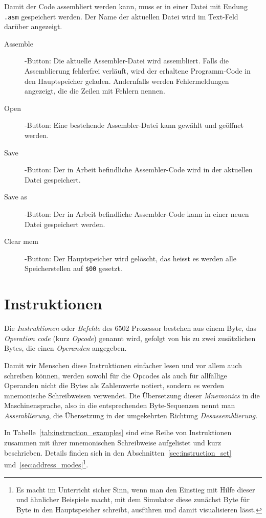 \documentclass[11pt]{scrartcl}
\newcommand{\hex}[1]{\texttt{\$#1}}
\begin{document}
\begin{itemize}
  Damit der Code assembliert werden kann, muss er in einer Datei mit
  Endung \lstinline!.asm! gespeichert werden. Der Name der aktuellen
  Datei wird im Text-Feld darüber angezeigt.
  \begin{description}
  \item[Assemble]-Button: Die aktuelle Assembler-Datei wird
    assembliert.
    Falls die Assemblierung fehlerfrei verläuft, wird der erhaltene
    Programm-Code in den Hauptspeicher geladen.
    Andernfalls werden Fehlermeldungen angezeigt, die die Zeilen mit
    Fehlern nennen.
  \item[Open]-Button: Eine bestehende Assembler-Datei kann gewählt und
    geöffnet werden.
  \item[Save]-Button: Der in Arbeit befindliche Assembler-Code wird in
    der aktuellen Datei gespeichert.
  \item[Save as]-Button: Der in Arbeit befindliche Assembler-Code kann
    in einer neuen Datei gespeichert werden.
  \item[Clear mem]-Button: Der Hauptspeicher wird gelöscht, das heisst
    es werden alle Speicherstellen auf \hex{00} gesetzt.
  \end{description}
\end{itemize}

\newpage

\section{Instruktionen}
\label{sec:instruktionen}


Die \emph{Instruktionen} oder \emph{Befehle} des 6502 Prozessor
bestehen aus einem Byte, das \emph{Operation code} (kurz
\emph{Opcode}) genannt wird, gefolgt von bis zu zwei zusätzlichen
Bytes, die einen \emph{Operanden} angegeben.

Damit wir Menschen diese Instruktionen einfacher lesen und vor allem auch
schreiben können, werden sowohl für die Opcodes als auch für
allfällige Operanden nicht die Bytes als Zahlenwerte notiert, sondern
es werden mnemonische Schreibweisen verwendet.
Die Übersetzung dieser \emph{Mnemonics} in die Maschinensprache, also
in die entsprechenden Byte-Sequenzen nennt man \emph{Assemblierung},
die Übersetzung in der umgekehrten Richtung \emph{Desassemblierung}.


In Tabelle~\ref{tab:instruction_examples} sind eine Reihe von
Instruktionen zusammen mit ihrer mnemonischen Schreibweise aufgelistet
und kurz beschrieben. Details finden sich in den
Abschnitten~\ref{sec:instruction_set}
und~\ref{sec:address_modes}\footnote{Es macht im Unterricht sicher
  Sinn, wenn man den Einstieg mit Hilfe dieser und ähnlicher Beispiele
  macht, mit dem Simulator diese zunächst Byte für Byte in den
  Hauptspeicher schreibt, ausführen und damit visualisieren lässt.}.
\end{document}
